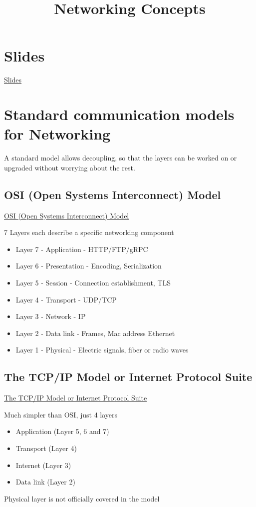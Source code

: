 \documentclass{article}
\title{Networking Concepts}
\author{}
\date{}
\begin{document}
\maketitle

\section*{Slides}
\href{files/networking-concepts/Fundamentals+of+Networking+for+Effective+Backends-v5.pdf}{Slides}

\section*{Standard communication models for Networking}

A standard model allows decoupling, so that the layers can be worked on or upgraded without worrying about the rest.

\subsection*{OSI (Open Systems Interconnect) Model}
\href{https://en.wikipedia.org/wiki/OSI_model}{OSI (Open Systems Interconnect) Model}

7 Layers each describe a specific networking component
\begin{itemize}
    \item Layer 7 - Application - HTTP/FTP/gRPC
    \item Layer 6 - Presentation - Encoding, Serialization
    \item Layer 5 - Session - Connection establishment, TLS
    \item Layer 4 - Transport - UDP/TCP
    \item Layer 3 - Network - IP
    \item Layer 2 - Data link - Frames, Mac address Ethernet
    \item Layer 1 - Physical - Electric signals, fiber or radio waves
\end{itemize}

\subsection*{The TCP/IP Model or Internet Protocol Suite}
\href{https://en.wikipedia.org/wiki/Internet_protocol_suite}{The TCP/IP Model or Internet Protocol Suite}

Much simpler than OSI, just 4 layers
\begin{itemize}
    \item Application (Layer 5, 6 and 7)
    \item Transport (Layer 4)
    \item Internet (Layer 3)
    \item Data link (Layer 2)
\end{itemize}
Physical layer is not officially covered in the model
\end{document}
